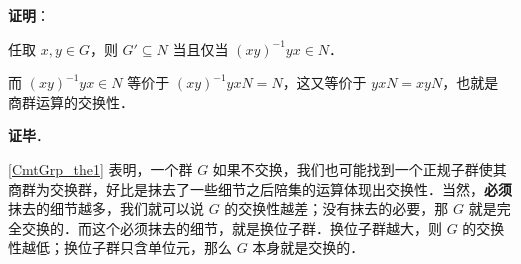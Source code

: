 \textbf{证明}：

任取 $x, y\in G$，则 $G'\subseteq N$ 当且仅当 $(xy)^{-1}yx\in N$．

而 $(xy)^{-1}yx\in N$ 等价于 $(xy)^{-1}yxN=N$，这又等价于 $yxN=xyN$，也就是商群运算的交换性．



\textbf{证毕}．

\autoref{CmtGrp_the1} 表明，一个群 $G$ 如果不交换，我们也可能找到一个正规子群使其商群为交换群，好比是抹去了一些细节之后陪集的运算体现出交换性．当然，\textbf{必须}抹去的细节越多，我们就可以说 $G$ 的交换性越差；没有抹去的必要，那 $G$ 就是完全交换的．而这个必须抹去的细节，就是换位子群．换位子群越大，则 $G$ 的交换性越低；换位子群只含单位元，那么 $G$ 本身就是交换的．












